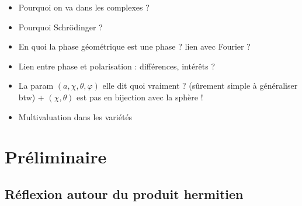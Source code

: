 \documentclass[hidelinks, french, oneside]{article}
\theoremstyle{enonce}
\theoremstyle{special}
\theoremstyle{rqlike}
\theoremstyle{exo}
\theoremstyle{demo}
\begin{document}
\begin{itemize}
	\item Pourquoi on va dans les complexes ?
	
	\item Pourquoi Schrödinger ?
	
	\item En quoi la phase géométrique est une phase ? lien avec Fourier ?
	
	\item Lien entre phase et polarisation : différences, intérêts ?
	
	\item La param $(a,\chi,\theta,\varphi)$ elle dit quoi vraiment ? (sûrement simple à généraliser btw) + $(\chi,\theta)$ est pas en bijection avec la sphère !
	
	\item Multivaluation dans les variétés \cite[p. 8]{bohm_geometric_2003}
\end{itemize}



\section{Préliminaire}


\subsection{Réflexion autour du produit hermitien}
\end{document}
